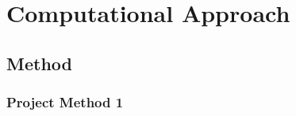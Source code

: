 \chapter{Computational Approach}\label{chap:computational}

\section{Method}\label{sec:Method}

\subsection{Project Method 1}\label{sec:project method}

